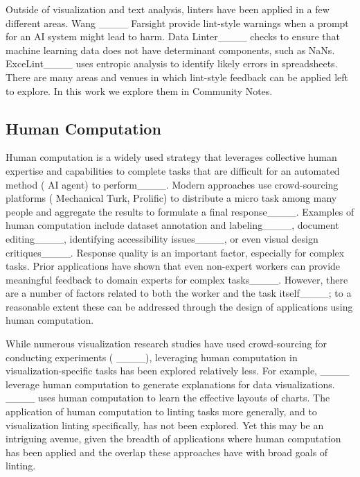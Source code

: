Outside of visualization and text analysis, linters have been applied in a few different areas.
Wang \etals{}____ Farsight provide lint-style warnings when a prompt for an AI system might lead to harm.
Data Linter____ checks to ensure that machine learning data does not have determinant components, such as NaNs.
ExceLint____ uses entropic analysis to identify likely errors in spreadsheets.
There are many areas and venues in which lint-style feedback can be applied left to explore. In this work we explore them in Community Notes.




















\subsection{Human Computation}\label{sec:rw_hc}
Human computation is a widely used strategy that leverages collective human expertise and capabilities to complete tasks that are difficult for an automated method (\eg{} AI agent) to perform____. Modern approaches use crowd-sourcing platforms (\eg{} Mechanical Turk, Prolific) to distribute a micro task among many people and aggregate the results to formulate a final response____.
Examples of human computation include dataset annotation and labeling____, document editing____, identifying accessibility issues____, or even visual design critiques____.
Response quality is an important factor, especially for complex tasks. Prior applications have shown that even non-expert workers can provide meaningful feedback to domain experts for complex tasks____. However, there are a number of factors related to both the worker and the task itself____; to a reasonable extent these can be addressed through the design of applications using human computation.

While numerous visualization research studies have used crowd-sourcing for conducting experiments (\eg{} ____), leveraging human computation in visualization-specific tasks has been explored relatively less.
For example, ____ leverage human computation to generate explanations for data visualizations. ____ uses human computation to learn the effective layouts of charts. The application of human computation to linting tasks more generally, and to visualization linting specifically, has not been explored. Yet this may be an intriguing avenue, given the breadth of applications where human computation has been applied and the overlap these approaches have with broad goals of linting.

